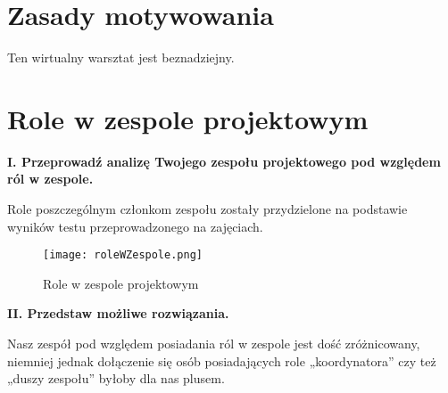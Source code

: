 
\section{Zasady motywowania}

Ten wirtualny warsztat jest beznadziejny.


\section{Role w zespole projektowym}

\textbf{I. Przeprowadź analizę Twojego zespołu projektowego pod względem ról w zespole.}

Role poszczególnym członkom zespołu zostały przydzielone na podstawie wyników testu przeprowadzonego na zajęciach.

\begin{figure}[!h]
\centering
\texttt{[image: roleWZespole.png]}
\caption{Role w zespole projektowym}
\label{fig:roleWZespole}
\end{figure}

\textbf{II. Przedstaw możliwe rozwiązania.}

Nasz zespół pod względem posiadania ról w zespole jest dość zróżnicowany, niemniej jednak dołączenie się osób posiadających role „koordynatora” czy też „duszy zespołu” byłoby dla nas plusem.



